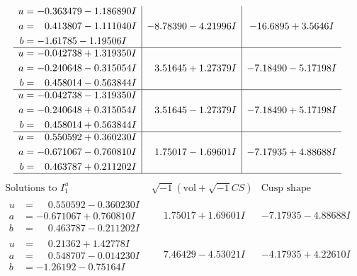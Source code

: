 \documentclass[1p]{elsarticle_modified}
\theoremstyle{definition}
\newcommand{\I}{\sqrt{-1}}
\begin{document}
$$\begin{array}{c|c|c}
\begin{aligned}
u &= -0.363479 - 1.186890 I \\
a &= \phantom{-}0.413807 - 1.111040 I \\
b &= -1.61785 - 1.19506 I\end{aligned}
 & -8.78390 - 4.21996 I & -16.6895 + 3.5646 I \\ \hline\begin{aligned}
u &= -0.042738 + 1.319350 I \\
a &= -0.240648 - 0.315054 I \\
b &= \phantom{-}0.458014 - 0.563844 I\end{aligned}
 & \phantom{-}3.51645 + 1.27379 I & -7.18490 - 5.17198 I \\ \hline\begin{aligned}
u &= -0.042738 - 1.319350 I \\
a &= -0.240648 + 0.315054 I \\
b &= \phantom{-}0.458014 + 0.563844 I\end{aligned}
 & \phantom{-}3.51645 - 1.27379 I & -7.18490 + 5.17198 I \\ \hline\begin{aligned}
u &= \phantom{-}0.550592 + 0.360230 I \\
a &= -0.671067 - 0.760810 I \\
b &= \phantom{-}0.463787 + 0.211202 I\end{aligned}
 & \phantom{-}1.75017 - 1.69601 I & -7.17935 + 4.88688 I\\
 \hline 
 \end{array}$$\newpage$$\begin{array}{c|c|c}  
\text{Solutions to }I^u_{1}& \I (\text{vol} + \sqrt{-1}CS) & \text{Cusp shape}\\
 \hline 
\begin{aligned}
u &= \phantom{-}0.550592 - 0.360230 I \\
a &= -0.671067 + 0.760810 I \\
b &= \phantom{-}0.463787 - 0.211202 I\end{aligned}
 & \phantom{-}1.75017 + 1.69601 I & -7.17935 - 4.88688 I \\ \hline\begin{aligned}
u &= \phantom{-}0.21362 + 1.42778 I \\
a &= \phantom{-}0.548707 - 0.014230 I \\
b &= -1.26192 - 0.75164 I\end{aligned}
 & \phantom{-}7.46429 - 4.53021 I & -4.17935 + 4.22610 I \\ \hline\begin{aligned}

\end{aligned}
\end{array}$$
\end{document}
